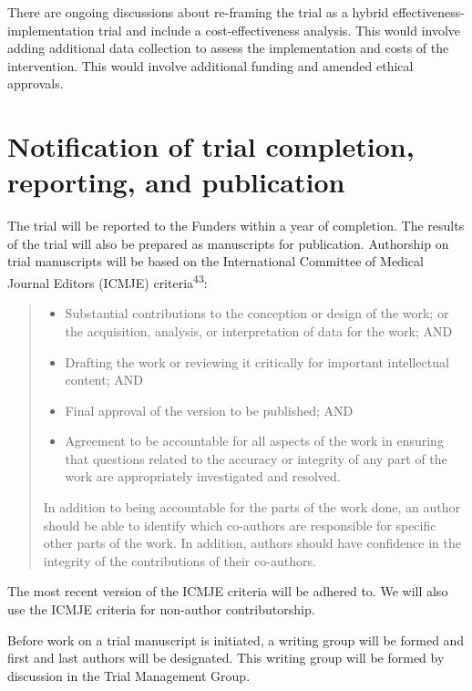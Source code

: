 \documentclass[
]{scrartcl}
\providecommand{\tightlist}{%
  \setlength{\itemsep}{0pt}\setlength{\parskip}{0pt}}\usepackage{longtable,booktabs,array}
\begin{document}
There are ongoing discussions about re-framing the trial as a hybrid
effectiveness-implementation trial and include a cost-effectiveness
analysis. This would involve adding additional data collection to assess
the implementation and costs of the intervention. This would involve
additional funding and amended ethical approvals.

\hypertarget{notification-of-trial-completion-reporting-and-publication}{%
\section{Notification of trial completion, reporting, and
publication}\label{notification-of-trial-completion-reporting-and-publication}}

The trial will be reported to the Funders within a year of completion.
The results of the trial will also be prepared as manuscripts for
publication. Authorship on trial manuscripts will be based on the
International Committee of Medical Journal Editors (ICMJE)
criteria\textsuperscript{43}:

\begin{quote}
\begin{itemize}
\tightlist
\item
  Substantial contributions to the conception or design of the work; or
  the acquisition, analysis, or interpretation of data for the work; AND
\item
  Drafting the work or reviewing it critically for important
  intellectual content; AND
\item
  Final approval of the version to be published; AND
\item
  Agreement to be accountable for all aspects of the work in ensuring
  that questions related to the accuracy or integrity of any part of the
  work are appropriately investigated and resolved.
\end{itemize}

In addition to being accountable for the parts of the work done, an
author should be able to identify which co-authors are responsible for
specific other parts of the work. In addition, authors should have
confidence in the integrity of the contributions of their co-authors.
\end{quote}

The most recent version of the ICMJE criteria will be adhered to. We
will also use the ICMJE criteria for non-author contributorship.

Before work on a trial manuscript is initiated, a writing group will be
formed and first and last authors will be designated. This writing group
will be formed by discussion in the Trial Management Group.
\end{document}

